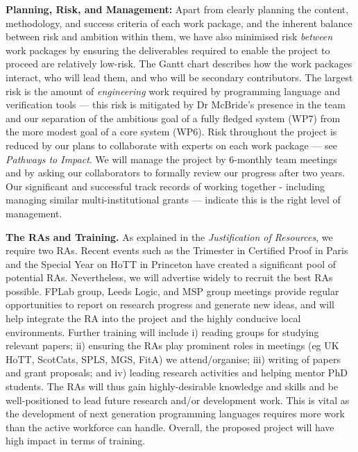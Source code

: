 \documentclass[a4paper,11pt]{article}
\begin{document}
{\bf Planning, Risk, and Management:} Apart from clearly
planning the content, methodology, and success criteria of each work package,
and the inherent balance between risk and ambition
within them, we have also minimised risk {\em between} work packages
by ensuring the deliverables required to enable the project to proceed 
are relatively low-risk. The Gantt chart describes how the work
packages interact, who will lead them, and who will be secondary
contributors. The largest risk is the 
amount of {\em engineering} work required by programming language
and verification tools --- this risk is mitigated by Dr McBride's
presence in the team and our 
separation of the ambitious
goal of a fully fledged system (WP7) from the more modest
goal of a core system (WP6). Risk throughout the project is reduced by
our plans to collaborate
with experts on each work package --- see {\em Pathways to Impact}. We
will manage the project by 6-monthly team meetings and by asking our
collaborators to formally review our progress after two years.  Our
significant and successful track records of working together -
including managing similar multi-institutional grants --- indicate
this is the right level of management.


{\bf The RAs and Training.} As explained in the
{\em Justification of Resources}, we require two RAs.
Recent events such as the Trimester in Certified Proof in Paris
and the Special Year on HoTT in Princeton have created a significant pool of
potential RAs. Nevertheless, we will advertise widely to recruit the best RAs
possible.  FPLab group, Leeds Logic, and MSP group meetings provide
regular opportunities to report on research progress and generate new
ideas, and will help integrate the RA into the project and the highly
conducive local environments. Further training will include i) reading
groups for studying relevant papers; ii) ensuring the RAs play
prominent roles in meetings (eg UK HoTT, ScotCats, SPLS, MGS, FitA) we
attend/organise; iii) writing of papers and grant proposals; and
iv) leading research activities and helping mentor PhD students.
The RAs will thus gain highly-desirable
knowledge and skills and be well-positioned to lead future research
and/or development work. This is vital as the development of
next generation programming languages requires more work than the
active workforce can handle. Overall, the proposed project will have
high impact in terms of training.


\end{document}
